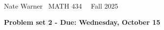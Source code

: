 \documentclass{report}
\title{\Huge{}}
\author{\huge{Nathan Warner}}
\date{\huge{}}
\begin{document}
    \pagebreak \bigbreak \noindent
    Nate Warner \ \quad \quad \quad \quad \quad \quad \quad \quad \quad \quad \quad \quad  MATH 434 \quad  \quad \quad \quad \quad \quad \quad \quad \quad \ \ \quad \quad Fall 2025
    \begin{center}
        \textbf{Problem set 2 - Due: Wednesday, October 15}
    \end{center}
    \bigbreak \noindent 
\end{document}
